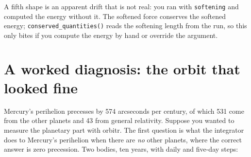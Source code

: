\documentclass[
  10.5pt,
  letterpaper,
]{scrbook}
\theoremstyle{definition}
\theoremstyle{plain}
\theoremstyle{remark}
\begin{document}
A fifth shape is an apparent drift that is not real: you ran with
\texttt{softening} and computed the energy without it. The softened
force conserves the softened energy; \texttt{conserved\_quantities()}
reads the softening length from the run, so this only bites if you
compute the energy by hand or override the argument.

\section{A worked diagnosis: the orbit that looked
fine}\label{a-worked-diagnosis-the-orbit-that-looked-fine}

Mercury's perihelion precesses by 574 arcseconds per century, of which
531 come from the other planets and 43 from general relativity. Suppose
you wanted to measure the planetary part with orbitr. The first question
is what the integrator does to Mercury's perihelion when there are
\emph{no} other planets, where the correct answer is zero precession.
Two bodies, ten years, with daily and five-day steps:
\end{document}
